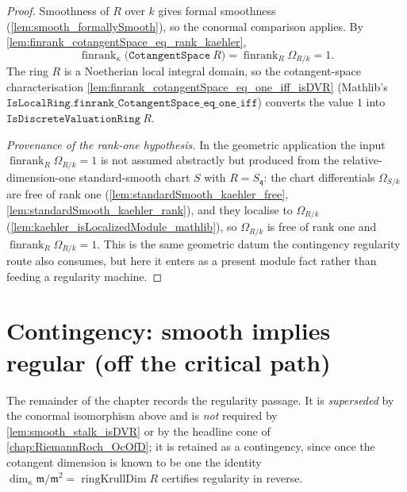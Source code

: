 \begin{proof}
  \leanok
  Smoothness of \(R\) over \(k\) gives formal smoothness
  (\cref{lem:smooth_formallySmooth}), so the conormal comparison applies. By
  \cref{lem:finrank_cotangentSpace_eq_rank_kaehler},
  \[
    \operatorname{finrank}_\kappa
      \bigl(\texttt{CotangentSpace}\ R\bigr)
    = \operatorname{finrank}_R \Omega_{R/k} = 1 .
  \]
  The ring \(R\) is a Noetherian local integral domain, so the
  cotangent-space characterisation
  \cref{lem:finrank_cotangentSpace_eq_one_iff_isDVR} (Mathlib's
  \(\texttt{IsLocalRing.finrank\_CotangentSpace\_eq\_one\_iff}\)) converts the
  value \(1\) into \(\texttt{IsDiscreteValuationRing}\ R\).

  \emph{Provenance of the rank-one hypothesis.} In the geometric application
  the input \(\operatorname{finrank}_R \Omega_{R/k} = 1\) is not assumed
  abstractly but produced from the relative-dimension-one standard-smooth
  chart \(S\) with \(R = S_{\mathfrak q}\): the chart differentials
  \(\Omega_{S/k}\) are free of rank one
  (\cref{lem:standardSmooth_kaehler_free},
  \cref{lem:standardSmooth_kaehler_rank}), and they localise to
  \(\Omega_{R/k}\) (\cref{lem:kaehler_isLocalizedModule_mathlib}), so
  \(\Omega_{R/k}\) is free of rank one and
  \(\operatorname{finrank}_R \Omega_{R/k} = 1\). This is the same geometric
  datum the contingency regularity route also consumes, but here it enters as
  a present module fact rather than feeding a regularity machine.
\end{proof}

\section{Contingency: smooth implies regular (off the critical path)}

The remainder of the chapter records the regularity passage. It is
\emph{superseded} by the conormal isomorphism above and is \emph{not} required
by \cref{lem:smooth_stalk_isDVR} or by the headline cone of
\cref{chap:RiemannRoch_OcOfD}; it is retained as a contingency, since
once the cotangent dimension is known to be one the identity
\(\dim_\kappa \mathfrak m/\mathfrak m^2 = \operatorname{ringKrullDim} R\)
certifies regularity in reverse.


